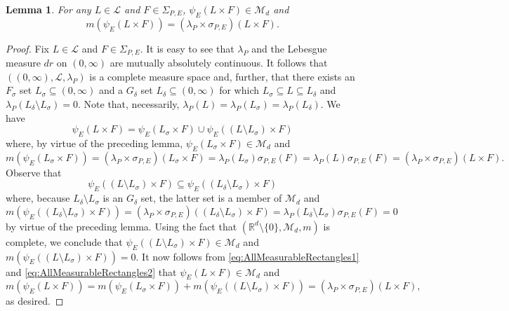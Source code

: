 \documentclass[11pt]{article}
\newtheorem{lemma}[theorem]{Lemma}
\theoremstyle{remark}
\begin{document}
\begin{lemma}\label{lem:AllMeasurableRectangles} For any $L\in\mathcal{L}$ and $F\in \Sigma_{P,E}$, $\psi_E(L\times F)\in\mathcal{M}_d$ and 
\begin{equation*}
m(\psi_E(L\times F))=(\lambda_P\times\sigma_{P,E})(L\times F).
\end{equation*}
\end{lemma}
\begin{proof}
Fix $L\in\mathcal{L}$ and $F\in\Sigma_{P,E}$. It is easy to see that $\lambda_P$ and the Lebesgue measure $dr$ on $(0,\infty)$ are mutually absolutely continuous. It follows that $((0,\infty), \mathcal{L},\lambda_P)$ is a complete measure space and, further, that there exists an $F_\sigma$ set $L_\sigma\subseteq (0,\infty)$ and a $G_\delta$ set $L_\delta\subseteq (0,\infty)$ for which $L_\sigma\subseteq L\subseteq L_\delta$ and $\lambda_P(L_\delta\setminus L_\sigma)=0$. Note that, necessarily, $\lambda_P(L)=\lambda_P(L_\sigma)=\lambda_P(L_\delta)$. We have
\begin{equation}\label{eq:AllMeasurableRectangles1}
\psi_E(L\times F)=\psi_E( L_\sigma\times F)\cup\psi_E((L\setminus L_\sigma)\times F)
\end{equation}
where, by virtue of the preceding lemma, $\psi_E(L_\sigma\times F)\in \mathcal{M}_d$ and
\begin{equation}\label{eq:AllMeasurableRectangles2}
m(\psi_E(L_{\sigma}\times F))=(\lambda_P\times\sigma_{P,E})( L_\sigma\times F)=\lambda_P(L_\sigma)\sigma_{P,E}(F)=\lambda_P(L)\sigma_{P,E}(F)=(\lambda_P\times\sigma_{P,E})(L\times F).
\end{equation}
Observe that
\begin{equation*}
\psi_E((L\setminus L_\sigma)\times F)\subseteq \psi_E((L_{\delta}\setminus L_\sigma)\times F)
\end{equation*}
where, because $L_\delta\setminus L_\sigma$ is an $G_{\delta}$ set, the latter set is a member of $\mathcal{M}_d$ and
\begin{equation*}
m(\psi_E((L_\delta\setminus L_\sigma)\times F))=(\lambda_P\times\sigma_{P,E})((L_\delta\setminus L_\sigma)\times F)=\lambda_P(L_\delta\setminus L_\sigma)\sigma_{P,E}(F)=0
\end{equation*}
by virtue of the preceding lemma. Using the fact that $(\mathbb{R}^d\setminus\{0\},\mathcal{M}_d,m)$ is complete, we conclude that $\psi_E((L\setminus L_\sigma)\times F)\in \mathcal{M}_d$ and $m(\psi_E((L\setminus L_\sigma)\times F))=0$. It now follows from \eqref{eq:AllMeasurableRectangles1} and \eqref{eq:AllMeasurableRectangles2} that $\psi_E(L\times F)\in\mathcal{M}_d$ and
\begin{equation*}
m(\psi_E(L\times F))=m(\psi_E(L_\sigma\times F))+m(\psi_E((L\setminus L_\sigma)\times F))=(\lambda_P\times\sigma_{P,E})(L\times F),
\end{equation*}
as desired.
\end{proof}
\end{document}
